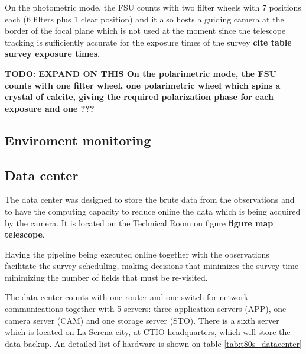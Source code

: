 \documentclass[9pt]{memoir}
\begin{document}
On the photometric mode, the FSU counts with two filter wheels with 7 positions each (6 filters plus 1 clear position) and it also hosts a guiding camera at the border of the focal plane which is not used at the moment since the telescope tracking is sufficiently accurate for the exposure times of the survey \textbf{ cite table survey exposure times}.

\textbf{ TODO: EXPAND ON THIS On the polarimetric mode, the FSU counts with one filter wheel, one polarimetric wheel which spins a crystal of calcite, giving the required polarization phase for each exposure and one ???}


\subsection{Enviroment monitoring}

\subsection{Data center}

The data center was designed to store the brute data from the observations and to have the computing capacity to reduce online the data which is being acquired by the camera. It is located on the Technical Room on figure \textbf{figure map telescope}.

Having the pipeline being executed online together with the observations facilitate the survey scheduling, making decisions that minimizes the survey time minimizing the number of fields that must be re-visited.

The data center counts with one router and one switch for network communications together with 5 servers: three application servers (APP), one camera server (CAM) and one storage server (STO). There is a sixth server which is located on La Serena city, at CTIO headquarters, which will store the data backup. An detailed list of hardware is shown on table \ref{tab:t80s_datacenter} 
\end{document}
